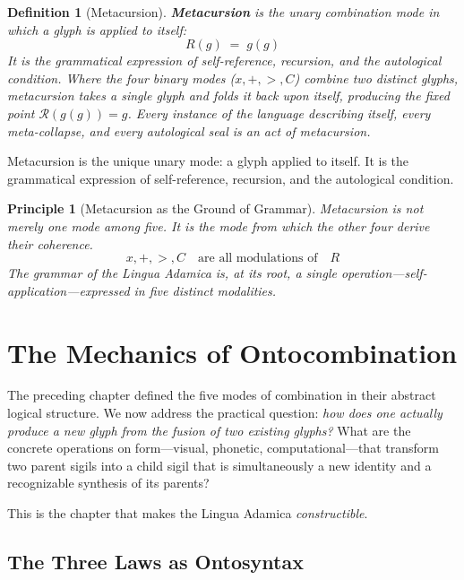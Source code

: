 \documentclass[12pt, letterpaper]{book}
\def\equiv{=}%
\def\otimes{x}%
\def\oplus{+}%
\def\triangleright{>}%
\def\subset{C}%
\def\circlearrowleft{R}%
\def\mathfrak#1{#1}%
\newtheorem{definition}{Definition}[chapter]
\newtheorem{principle}{Principle}[chapter]
\begin{document}
\begin{definition}[Metacursion]\label{def:metacursion}
\textbf{Metacursion} is the unary combination mode in which a glyph is applied to itself:
\[
\circlearrowleft(\mathfrak{g}) \;\equiv\; \mathfrak{g}(\mathfrak{g})
\]
It is the grammatical expression of self-reference, recursion, and the autological condition. Where the four binary modes ($\otimes, \oplus, \triangleright, \subset$) combine two distinct glyphs, metacursion takes a single glyph and folds it back upon itself, producing the fixed point $\mathcal{R}(\mathfrak{g}(\mathfrak{g})) = \mathfrak{g}$. Every instance of the language describing itself, every meta-collapse, and every autological seal is an act of metacursion.
\end{definition}

Metacursion is the unique unary mode: a glyph applied to itself. It is the grammatical expression of self-reference, recursion, and the autological condition.

\begin{principle}[Metacursion as the Ground of Grammar]
Metacursion is not merely one mode among five. It is the mode from which the other four derive their coherence.
\[
\otimes, \oplus, \triangleright, \subset \quad \text{are all modulations of} \quad \circlearrowleft
\]
The grammar of the Lingua Adamica is, at its root, a single operation---self-application---expressed in five distinct modalities.
\end{principle}


\chapter{The Mechanics of Ontocombination}

The preceding chapter defined the five modes of combination in their abstract logical structure. We now address the practical question: \textit{how does one actually produce a new glyph from the fusion of two existing glyphs?} What are the concrete operations on form---visual, phonetic, computational---that transform two parent sigils into a child sigil that is simultaneously a new identity and a recognizable synthesis of its parents?

This is the chapter that makes the Lingua Adamica \textit{constructible}.

\section{The Three Laws as Ontosyntax}
\end{document}
